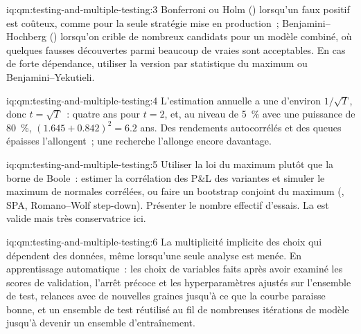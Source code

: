 \begin{solution}{iq:qm:testing-and-multiple-testing:3}
Bonferroni ou Holm () lorsqu'un faux positif est coûteux, comme pour la seule stratégie mise en production~; Benjamini--Hochberg
() lorsqu'on crible de nombreux candidats pour un modèle combiné, où quelques fausses découvertes parmi beaucoup de vraies sont acceptables.
En cas de forte dépendance, utiliser la version par statistique du maximum ou Benjamini--Yekutieli.
\end{solution}

\begin{solution}{iq:qm:testing-and-multiple-testing:4}
L'estimation annuelle a une  d'environ $1/\sqrt T$, donc $t = \sqrt T$~: quatre ans pour $t = 2$, et, au niveau de 5~\% avec une puissance de 80~\%,
$(1.645 + 0.842)^2 = 6.2$ ans. Des rendements autocorrélés et des queues épaisses l'allongent~; une recherche l'allonge encore davantage.
\end{solution}

\begin{solution}{iq:qm:testing-and-multiple-testing:5}
Utiliser la loi du maximum plutôt que la borne de Boole~: estimer la corrélation des P\&L des variantes et simuler le maximum de
normales corrélées, ou faire un bootstrap conjoint du maximum (, SPA, Romano--Wolf step-down). Présenter le nombre effectif
d'essais. La  est valide mais très conservatrice ici.
\end{solution}

\begin{solution}{iq:qm:testing-and-multiple-testing:6}
La multiplicité implicite des choix qui dépendent des données, même lorsqu'une seule analyse est menée. En apprentissage automatique~: les choix de variables faits après
avoir examiné les scores de validation, l'arrêt précoce et les hyperparamètres ajustés sur l'ensemble de test, relances avec de nouvelles graines jusqu'à ce que la courbe paraisse bonne,
et un ensemble de test réutilisé au fil de nombreuses itérations de modèle jusqu'à devenir un ensemble d'entraînement.
\end{solution}

